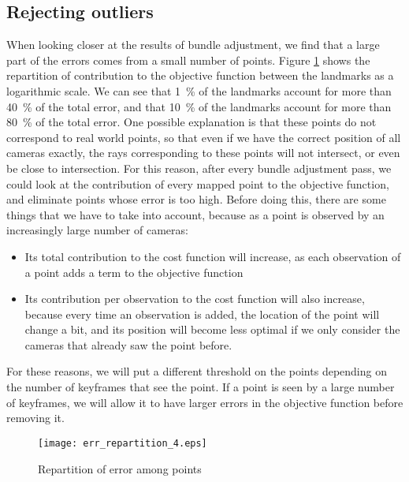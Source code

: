 \subsection{Rejecting outliers}
When looking closer at the results of bundle adjustment, we find that a large part of the errors comes from a small number of points. Figure \ref{fig:errorrepartition} shows the repartition of contribution to the objective function between the landmarks as a logarithmic scale. We can see that \SI{1}{\percent} of the landmarks account for more than \SI{40}{\percent} of the total error, and that \SI{10}{\percent} of the landmarks account for more than \SI{80}{\percent} of the total error.  One possible explanation is that these points do not correspond to real world points, so that even if we have the correct position of all cameras exactly, the rays corresponding to these points will not intersect, or even be close to intersection. For this reason, after every bundle adjustment pass, we could look at the contribution of every mapped point to the objective function, and eliminate points whose error is too high. Before doing this, there are some things that we have to take into account, because as a point is observed by an increasingly large number of cameras:
\begin{itemize}
  \item Its total contribution to the cost function will increase, as each observation of a point adds a term to the objective function
  \item Its contribution per observation to the cost function will also increase, because every time an observation is added, the location of the point will change a bit, and its position will become less optimal if we only consider the cameras that already saw the point before.
\end{itemize}
For these reasons, we will put a different threshold on the points depending on the number of keyframes that see the point. If a point is seen by a large number of keyframes, we will allow it to have larger errors in the objective function before removing it.


\begin{figure}[H]
  \centering
  \texttt{[image: err\_repartition\_4.eps]}
  \caption{Repartition of error among points}
  \label{fig:errorrepartition}
\end{figure}
